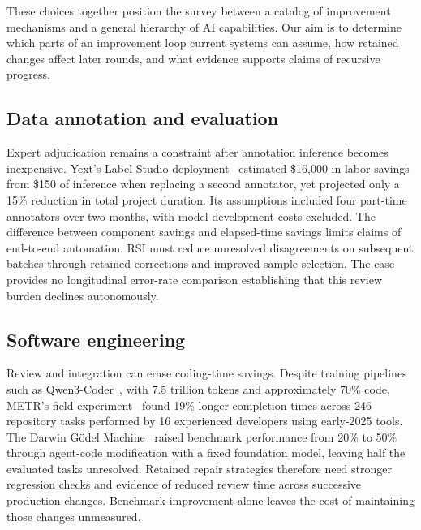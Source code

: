 These choices together position the survey between a catalog of improvement mechanisms and a general hierarchy of AI capabilities. Our aim is to determine which parts of an improvement loop current systems can assume, how retained changes affect later rounds, and what evidence supports claims of recursive progress.


\iffalse

\noindent{}



\subsection{Data annotation and evaluation}
Expert adjudication remains a constraint after annotation inference becomes inexpensive. Yext's Label Studio deployment~\cite{labelstudio2026yext} estimated \$16,000 in labor savings from \$150 of inference when replacing a second annotator, yet projected only a 15\% reduction in total project duration. Its assumptions included four part-time annotators over two months, with model development costs excluded. The difference between component savings and elapsed-time savings limits claims of end-to-end automation. RSI must reduce unresolved disagreements on subsequent batches through retained corrections and improved sample selection. The case provides no longitudinal error-rate comparison establishing that this review burden declines autonomously.

\subsection{Software engineering}
Review and integration can erase coding-time savings. Despite training pipelines such as Qwen3-Coder~\cite{qwen2025coder}, with 7.5 trillion tokens and approximately 70\% code, METR's field experiment~\cite{metr2025developers} found 19\% longer completion times across 246 repository tasks performed by 16 experienced developers using early-2025 tools. The Darwin G\"odel Machine~\cite{sakana2025dgm} raised benchmark performance from 20\% to 50\% through agent-code modification with a fixed foundation model, leaving half the evaluated tasks unresolved. Retained repair strategies therefore need stronger regression checks and evidence of reduced review time across successive production changes. Benchmark improvement alone leaves the cost of maintaining those changes unmeasured.

